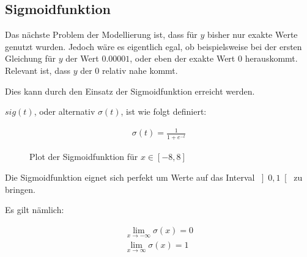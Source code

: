 \documentclass[a4paper]{report}
\begin{document}
\subsection{Sigmoidfunktion}
\begin{flushleft}   
Das nächste Problem der Modellierung ist, dass für $y$ bisher nur exakte Werte genutzt wurden.
Jedoch wäre es eigentlich egal, ob beispielsweise bei der ersten Gleichung für $y$ der Wert $0.00001$, oder eben der exakte Wert $0$ herauskommt.
Relevant ist, dass $y$ der $0$ relativ nahe kommt.

Dies kann durch den Einsatz der Sigmoidfunktion erreicht werden.

$sig(t)$, oder alternativ $\sigma(t)$, ist wie folgt definiert:
\end{flushleft}
\begin{align}
    \sigma(t)=\frac{1}{1+e^{-t}}
\end{align}

\begin{figure}[ht]
    \centering
    \caption{Plot der Sigmoidfunktion für $x\in\left[-8,8\right]$}
    \label{fig:sigplot}
\end{figure}

\begin{flushleft}   
Die Sigmoidfunktion eignet sich perfekt um Werte auf das Interval $\left]0,1\right[$ zu bringen.

Es gilt nämlich:
\end{flushleft}
\begin{align}
    \lim_{x\to-\infty} \sigma(x) = 0 \\
    \lim_{x\to\infty} \sigma(x) = 1
\end{align}
\end{document}
